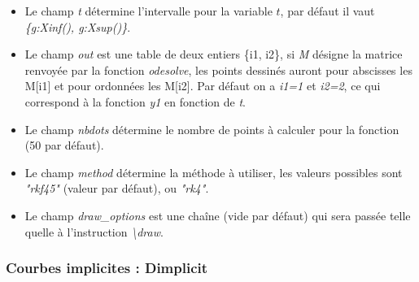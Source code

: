 \begin{itemize}
\begin{itemize}
      \begin{itemize}
        \item Le champ \emph{t} détermine l'intervalle pour la variable \(t\), par défaut il vaut \emph{\{g:Xinf(), g:Xsup()\}}.
        \item Le champ \emph{out} est une table de deux entiers \{i1, i2\}, si \emph{M} désigne la matrice renvoyée par la fonction \emph{odesolve}, les points dessinés auront pour abscisses les M{[}i1{]} et pour ordonnées les M{[}i2{]}. Par défaut on a \emph{i1=1} et \emph{i2=2}, ce qui correspond à la fonction \emph{y1} en fonction de \emph{t}.
        \item Le champ \emph{nbdots} détermine le nombre de points à calculer pour la fonction (50 par défaut).
        \item Le champ \emph{method} détermine la méthode à utiliser, les valeurs possibles sont \emph{"rkf45"} (valeur par défaut), ou \emph{"rk4"}.
        \item Le champ \emph{draw\_options} est une chaîne (vide par défaut) qui sera passée telle quelle à l'instruction \emph{\textbackslash draw}.
      \end{itemize}
  \end{itemize}
\end{itemize}

\subsubsection{Courbes implicites : Dimplicit}

